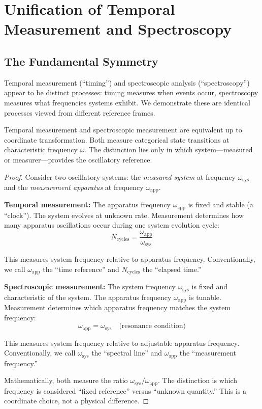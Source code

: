 \section{Unification of Temporal Measurement and Spectroscopy}
\label{sec:time_spec}

\subsection{The Fundamental Symmetry}

Temporal measurement (``timing'') and spectroscopic analysis (``spectroscopy'') appear to be distinct processes: timing measures when events occur, spectroscopy measures what frequencies systems exhibit. We demonstrate these are identical processes viewed from different reference frames.

\begin{theorem}
\label{thm:time_spec_duality}
Temporal measurement and spectroscopic measurement are equivalent up to coordinate transformation. Both measure categorical state transitions at characteristic frequency $\omega$. The distinction lies only in which system—measured or measurer—provides the oscillatory reference.
\end{theorem}

\begin{proof}
Consider two oscillatory systems: the \textit{measured system} at frequency $\omega_{\text{sys}}$ and the \textit{measurement apparatus} at frequency $\omega_{\text{app}}$.

\textbf{Temporal measurement:} The apparatus frequency $\omega_{\text{app}}$ is fixed and stable (a ``clock''). The system evolves at unknown rate. Measurement determines how many apparatus oscillations occur during one system evolution cycle:
\begin{equation}
N_{\text{cycles}} = \frac{\omega_{\text{app}}}{\omega_{\text{sys}}}
\end{equation}

This measures system frequency relative to apparatus frequency. Conventionally, we call $\omega_{\text{app}}$ the ``time reference'' and $N_{\text{cycles}}$ the ``elapsed time.''

\textbf{Spectroscopic measurement:} The system frequency $\omega_{\text{sys}}$ is fixed and characteristic of the system. The apparatus frequency $\omega_{\text{app}}$ is tunable. Measurement determines which apparatus frequency matches the system frequency:
\begin{equation}
\omega_{\text{app}} = \omega_{\text{sys}} \quad \text{(resonance condition)}
\end{equation}

This measures system frequency relative to adjustable apparatus frequency. Conventionally, we call $\omega_{\text{sys}}$ the ``spectral line'' and $\omega_{\text{app}}$ the ``measurement frequency.''

Mathematically, both measure the ratio $\omega_{\text{sys}}/\omega_{\text{app}}$. The distinction is which frequency is considered ``fixed reference'' versus ``unknown quantity.'' This is a coordinate choice, not a physical difference.
\end{proof}

